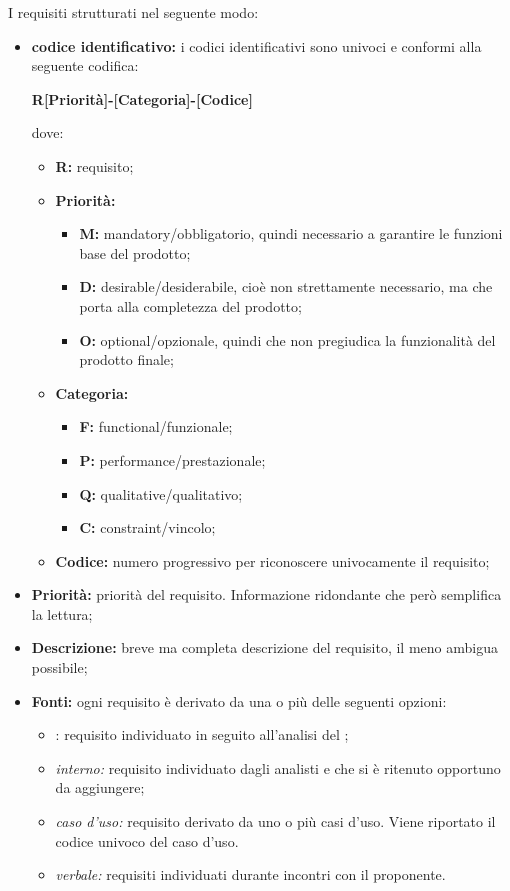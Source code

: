 
I requisiti strutturati nel seguente modo:

\begin{itemize}
	
	\item \textbf{codice identificativo:} i codici identificativi sono univoci e conformi alla seguente codifica:
	\begin{center}
		\textbf{R[Priorità]-[Categoria]-[Codice]}
	\end{center}
	dove: 
		\begin{itemize}
			\item \textbf{R:} requisito;
			\item \textbf{Priorità:}
			\begin{itemize}
				\item \textbf{M:} mandatory/obbligatorio, quindi necessario a garantire le funzioni base del prodotto;
				\item \textbf{D:} desirable/desiderabile, cioè non strettamente necessario, ma che porta alla completezza del prodotto;
				\item \textbf{O:} optional/opzionale, quindi che non pregiudica la funzionalità del prodotto finale;
			\end{itemize}
			\item \textbf{Categoria:}
			\begin{itemize}
				\item \textbf{F:} functional/funzionale;
				\item \textbf{P:} performance/prestazionale;
				\item \textbf{Q:} qualitative/qualitativo;
				\item \textbf{C:} constraint/vincolo;
			\end{itemize}
			\item \textbf{Codice:} numero progressivo per riconoscere univocamente il requisito;
		\end{itemize}
	
	\item \textbf{Priorità:} priorità del requisito. Informazione ridondante che però semplifica la lettura;
	
	\item \textbf{Descrizione:} breve ma completa descrizione del requisito, il meno ambigua possibile;
	
	\item \textbf{Fonti:} ogni requisito è derivato da una o più delle seguenti opzioni:
		\begin{itemize}
			\item {}: requisito individuato in seguito all'analisi del ;
			\item \textit{interno:} requisito individuato dagli analisti e che si è ritenuto opportuno da aggiungere;
			\item \textit{caso d'uso:} requisito derivato da uno o più casi d'uso. Viene riportato il codice univoco del caso d'uso.
			\item \textit{verbale:} requisiti individuati durante incontri con il proponente.			
		\end{itemize}	
\end{itemize}

